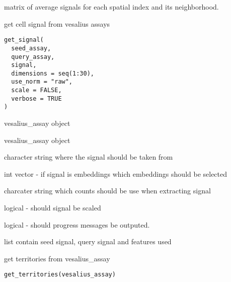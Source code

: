 \documentclass[a4paper]{book}
\begin{document}
%
\begin{Value}
matrix of average signals for each spatial index and its 
neighborhood.
\end{Value}
%
\begin{Description}
get cell signal from vesalius assays
\end{Description}
%
\begin{Usage}
\begin{verbatim}
get_signal(
  seed_assay,
  query_assay,
  signal,
  dimensions = seq(1:30),
  use_norm = "raw",
  scale = FALSE,
  verbose = TRUE
)
\end{verbatim}
\end{Usage}
%
\begin{Arguments}
\begin{ldescription}
\item[\code{seed\_assay}] vesalius\_assay object

\item[\code{query\_assay}] vesalius\_assay object

\item[\code{signal}] character string where the signal should be taken from

\item[\code{dimensions}] int vector - if signal is embeddings which 
embeddings should be selected

\item[\code{use\_norm}] charcater string which counts should be use when
extracting signal

\item[\code{scale}] logical - should signal be scaled

\item[\code{verbose}] logical - should progress messages be outputed.
\end{ldescription}
\end{Arguments}
%
\begin{Value}
list contain seed signal, query signal and features used
\end{Value}
%
\begin{Description}
get territories from vesalius\_assay
\end{Description}
%
\begin{Usage}
\begin{verbatim}
get_territories(vesalius_assay)
\end{verbatim}
\end{Usage}
\end{document}
